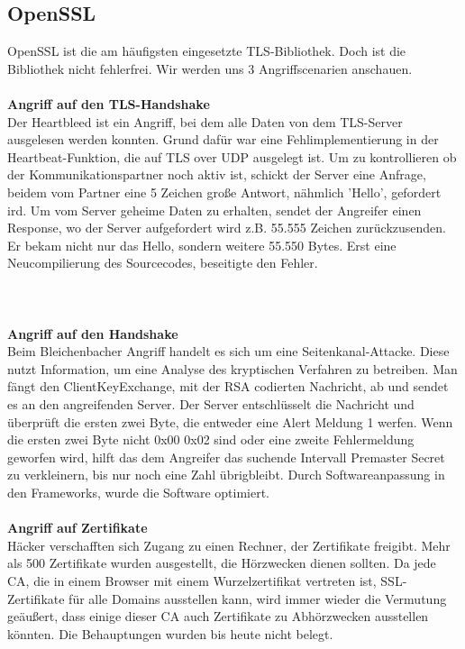 \documentclass[11pt]{scrartcl}
\begin{document}
\subsection{OpenSSL}
\label{sec:openssl}
OpenSSL ist die am häufigsten eingesetzte TLS-Bibliothek. Doch ist die Bibliothek nicht fehlerfrei. Wir werden uns 3 Angriffscenarien anschauen.\\\\
\noindent
\textbf{Angriff auf den TLS-Handshake}\\
Der Heartbleed ist ein Angriff, bei dem alle Daten von dem TLS-Server ausgelesen werden konnten. Grund dafür war eine Fehlimplementierung in der Heartbeat-Funktion, die auf TLS over UDP ausgelegt ist. Um zu kontrollieren ob der Kommunikationspartner noch aktiv ist, schickt der Server eine Anfrage, beidem vom Partner eine 5 Zeichen große Antwort, nähmlich 'Hello', gefordert ird. Um vom Server geheime Daten zu erhalten, sendet der Angreifer einen Response, wo der Server aufgefordert wird z.B. 55.555 Zeichen zurückzusenden. Er bekam nicht nur das Hello, sondern weitere 55.550 Bytes. Erst eine Neucompilierung des Sourcecodes, beseitigte den Fehler.\\\\
\noindent\\\\
\textbf{Angriff auf den Handshake}\\
Beim Bleichenbacher Angriff handelt es sich um eine Seitenkanal-Attacke. Diese nutzt Information, um eine Analyse des kryptischen Verfahren zu betreiben. Man fängt den ClientKeyExchange, mit der RSA codierten Nachricht, ab und sendet es an den angreifenden Server. Der Server entschlüsselt die Nachricht und überprüft die ersten zwei Byte, die entweder eine Alert Meldung 1 werfen. Wenn die ersten zwei Byte nicht 0x00 0x02 sind oder eine zweite Fehlermeldung geworfen wird, hilft das dem Angreifer das suchende Intervall Premaster Secret zu verkleinern, bis nur noch eine Zahl übrigbleibt. Durch Softwareanpassung in den Frameworks, wurde die Software optimiert.\\\\
\noindent
\textbf{Angriff auf Zertifikate}\\
Häcker verschafften sich Zugang zu einen Rechner, der Zertifikate freigibt. Mehr als 500 Zertifikate wurden ausgestellt, die Hörzwecken dienen sollten. \grqq{}Da jede CA, die in einem Browser mit einem Wurzelzertifikat vertreten ist, SSL-Zertifikate für alle Domains ausstellen kann, wird immer wieder die Vermutung geäußert, dass einige dieser CA auch Zertifikate zu Abhörzwecken ausstellen könnten.\grqq{}\cite{1} Die Behauptungen wurden bis heute nicht belegt. \cite{1}

\newpage
\listoffigures
{}
\mbox{}
\nocite{*}


\end{document}
